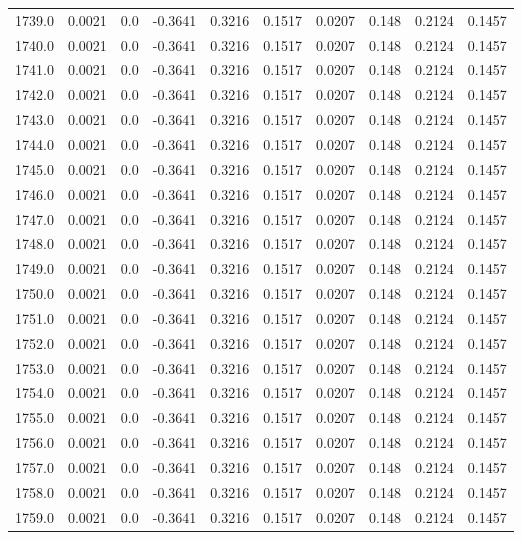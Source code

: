 \begin{longtable}{lrrrrrrrrr}
1739.0 & 0.0021 & 0.0 & -0.3641 & 0.3216 & 0.1517 & 0.0207 & 0.148 & 0.2124 & 0.1457 \\
1740.0 & 0.0021 & 0.0 & -0.3641 & 0.3216 & 0.1517 & 0.0207 & 0.148 & 0.2124 & 0.1457 \\
1741.0 & 0.0021 & 0.0 & -0.3641 & 0.3216 & 0.1517 & 0.0207 & 0.148 & 0.2124 & 0.1457 \\
1742.0 & 0.0021 & 0.0 & -0.3641 & 0.3216 & 0.1517 & 0.0207 & 0.148 & 0.2124 & 0.1457 \\
1743.0 & 0.0021 & 0.0 & -0.3641 & 0.3216 & 0.1517 & 0.0207 & 0.148 & 0.2124 & 0.1457 \\
1744.0 & 0.0021 & 0.0 & -0.3641 & 0.3216 & 0.1517 & 0.0207 & 0.148 & 0.2124 & 0.1457 \\
1745.0 & 0.0021 & 0.0 & -0.3641 & 0.3216 & 0.1517 & 0.0207 & 0.148 & 0.2124 & 0.1457 \\
1746.0 & 0.0021 & 0.0 & -0.3641 & 0.3216 & 0.1517 & 0.0207 & 0.148 & 0.2124 & 0.1457 \\
1747.0 & 0.0021 & 0.0 & -0.3641 & 0.3216 & 0.1517 & 0.0207 & 0.148 & 0.2124 & 0.1457 \\
1748.0 & 0.0021 & 0.0 & -0.3641 & 0.3216 & 0.1517 & 0.0207 & 0.148 & 0.2124 & 0.1457 \\
1749.0 & 0.0021 & 0.0 & -0.3641 & 0.3216 & 0.1517 & 0.0207 & 0.148 & 0.2124 & 0.1457 \\
1750.0 & 0.0021 & 0.0 & -0.3641 & 0.3216 & 0.1517 & 0.0207 & 0.148 & 0.2124 & 0.1457 \\
1751.0 & 0.0021 & 0.0 & -0.3641 & 0.3216 & 0.1517 & 0.0207 & 0.148 & 0.2124 & 0.1457 \\
1752.0 & 0.0021 & 0.0 & -0.3641 & 0.3216 & 0.1517 & 0.0207 & 0.148 & 0.2124 & 0.1457 \\
1753.0 & 0.0021 & 0.0 & -0.3641 & 0.3216 & 0.1517 & 0.0207 & 0.148 & 0.2124 & 0.1457 \\
1754.0 & 0.0021 & 0.0 & -0.3641 & 0.3216 & 0.1517 & 0.0207 & 0.148 & 0.2124 & 0.1457 \\
1755.0 & 0.0021 & 0.0 & -0.3641 & 0.3216 & 0.1517 & 0.0207 & 0.148 & 0.2124 & 0.1457 \\
1756.0 & 0.0021 & 0.0 & -0.3641 & 0.3216 & 0.1517 & 0.0207 & 0.148 & 0.2124 & 0.1457 \\
1757.0 & 0.0021 & 0.0 & -0.3641 & 0.3216 & 0.1517 & 0.0207 & 0.148 & 0.2124 & 0.1457 \\
1758.0 & 0.0021 & 0.0 & -0.3641 & 0.3216 & 0.1517 & 0.0207 & 0.148 & 0.2124 & 0.1457 \\
1759.0 & 0.0021 & 0.0 & -0.3641 & 0.3216 & 0.1517 & 0.0207 & 0.148 & 0.2124 & 0.1457 \\

\end{longtable}
